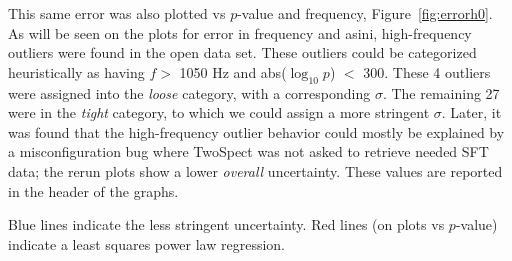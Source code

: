 This same error was also plotted vs $p$-value and frequency, Figure~\ref{fig:errorh0}. As will be seen on the plots for error in frequency and asini, high-frequency outliers were found in the open data set. These outliers could be categorized heuristically as having $f >$ 1050 Hz and abs($\log_{10}p$) $<$ 300. These 4 outliers were assigned into the \textit{loose} category, with a corresponding $\sigma$. The remaining 27 were in the \textit{tight} category, to which we could assign a more stringent $\sigma$. Later, it was found that the high-frequency outlier behavior could mostly be explained by a misconfiguration bug where TwoSpect was not asked to retrieve needed SFT data; the rerun plots show a lower \textit{overall} uncertainty. These values are reported in the header of the graphs.

Blue lines indicate the less stringent uncertainty. Red lines (on plots vs $p$-value) indicate a least squares power law regression.

